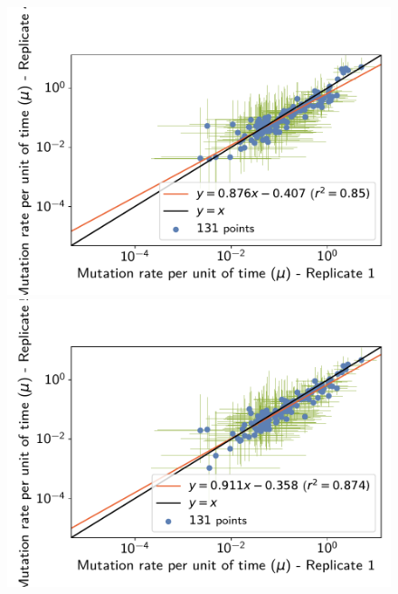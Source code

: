 \documentclass{article}
\begin{document}
\begin{figure}[H]
\begin{minipage}{0.32\linewidth}
			\includegraphics[width=\linewidth, page=1]{isopods/12CDS_SiteMutSelBranchNe_Rep-1-4_LogMutationRatePerTime}
		\end{minipage}
		\begin{minipage}{0.32\linewidth}
			\includegraphics[width=\linewidth, page=1]{isopods/12CDS_SiteMutSelBranchNe_Rep-1-5_LogMutationRatePerTime}
		\end{minipage}
		\begin{minipage}{0.32\linewidth}

\end{minipage}
\end{figure}
\end{document}
